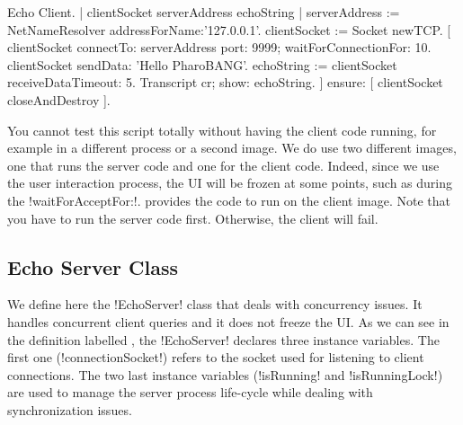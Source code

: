 \documentclass[a4paper,10pt,twoside]{book}
\begin{document}
\begin{script}[echoClient]{Echo Client.}
| clientSocket serverAddress echoString |
serverAddress := NetNameResolver addressForName:'127.0.0.1'.
clientSocket := Socket newTCP.
[ clientSocket 
	connectTo: serverAddress port: 9999;
	waitForConnectionFor: 10.
 clientSocket sendData: 'Hello PharoBANG'.
 echoString  := clientSocket receiveDataTimeout: 5.
 Transcript cr; show: echoString.
] ensure: [ clientSocket closeAndDestroy ].
\end{script}

You cannot test this script totally without having the client code running, for example in a different process or a second image. 
We do use two different images, one that runs the server code and one for the client code. 
Indeed, since we use the user interaction process, the \pharo UI will be frozen at some points, such as during the \ct!waitForAcceptFor:!.
 provides the code to run on the client image.
Note that you have to run the server code first.
Otherwise, the client will fail.

%

\subsection{Echo Server Class}
We define here the \ct!EchoServer! class that deals with concurrency issues.
It handles concurrent client queries and it does not freeze the UI.
As we can see in the definition labelled , the \ct!EchoServer! declares three instance variables.
The first one (\ct!connectionSocket!) refers to the socket used for listening to client connections.
The two last instance variables (\ct!isRunning! and \ct!isRunningLock!) are used to manage the server process life-cycle while dealing with synchronization issues.
 
\end{document}
